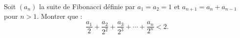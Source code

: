 Soit $(a_n)$ la suite de Fibonacci définie par $a_1 = a_2 = 1$ et $a_{n+1} = a_n + a_{n-1}$ pour $n > 1$. Montrer que :
\[
\frac{a_1}{2} + \frac{a_2}{2^2} + \frac{a_3}{2^3} + \cdots + \frac{a_n}{2^n} < 2.
\]
